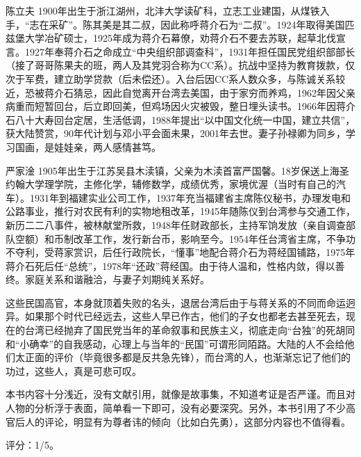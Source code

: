 \begin{description*}
    \item[陈立夫] 1900年出生于浙江湖州，北沣大学读矿科，立志工业建国，从煤铁入手，“志在采矿”。陈其美是其二叔，因此称呼蒋介石为“二叔”。1924年取得美国匹兹堡大学冶矿硕士，1925年成为蒋介石幕僚，劝蒋介石不要去苏联，起草北伐宣言。1927年奉蒋介石之命成立“中央组织部调查科”，1931年担任国民党组织部部长（接了哥哥陈果夫的班，两人及其党羽合称为CC系）。抗战中坚持为教育拨款，仅次于军费，建立助学贷款（后未偿还）。入台后因CC系人数众多，与陈诚关系较近，恐被蒋介石猜忌，因此自觉离开台湾去美国，由于家穷而养鸡，1962年因父亲病重而短暂回台，后立即回美，但鸡场因火灾被毁，整日埋头读书。1966年因蒋介石八十大寿回台定居，生活低调，1988年提出“以中国文化统一中国，建立共信”，获大陆赞赏，90年代计划与邓小平会面未果，2001年去世。妻子孙禄卿为同乡，学习国画，是娃娃亲，两人感情甚笃。
    \item[严家淦] 1905年出生于江苏吴县木渎镇，父亲为木渎首富严国馨。18岁保送上海圣约翰大学理学院，主修化学，辅修数学，成绩优秀，家境优渥（当时有自己的汽车）。1931年到福建实业公司工作，1937年充当福建省主席陈仪秘书，办理发电和公路事业，推行对农民有利的实物地租改革，1945年随陈仪到台湾参与交通工作，新历二二八事件，被林献堂所救，1948年任财政部长，主持军饷发放（亲自调查部队空额）和币制改革工作，发行新台币，影响至今。1954年任台湾省主席，不争功不夺利，受蒋家赏识，后任行政院长，“懂事”地配合蒋介石为蒋经国铺路，1975年蒋介石死后任“总统”，1978年“还政”蒋经国。由于待人温和，性格内敛，得以善终。家庭关系和谐融洽，与妻子刘期纯关系好。
\end{description*}

这些民国高官，本身就顶着失败的名头，退居台湾后由于与蒋关系的不同而命运迥异。如果那个时代已经远去，这些人早已作古，他们的子女也都老去甚至死去，现在的台湾已经抛弃了国民党当年的革命叙事和民族主义，彻底走向“台独”的死胡同和“小确幸”的自我感动，心理上与当年的“民国”可谓形同陌路。大陆的人不会给他们太正面的评价（毕竟很多都是反共急先锋），而台湾的人，也渐渐忘记了他们的功过，这些人，真是可悲可叹。

本书内容十分浅近，没有文献引用，就像是故事集，不知道考证是否严谨。而且对人物的分析浮于表面，简单看一下即可，没有必要深究。另外，本书引用了不少高官后人的评论，明显有为尊者讳的倾向（比如白先勇），这部分内容也不值得看。

评分：1/5。
